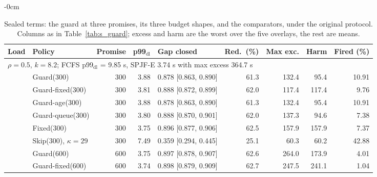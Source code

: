 \documentclass[mathematics,supfile,submit,moreauthors]{Definitions/mdpi}
\newcommand{\sealednum}[1]{#1}
\begin{document}
\begin{table}[htbp]
\begin{adjustwidth}{-\extralength}{0cm}
\centering
\caption{Sealed terms: the guard at three promises, its three budget shapes, and the comparators, under the original protocol. Columns as in Table~\ref{tab:s_guard}; excess and harm are the worst over the five overlays, the rest are means.}
\label{tab:guard_sealed}
\small
\setlength{\tabcolsep}{3pt}
\begin{tabular}{llrrlrrrr}
\toprule
Load & Policy & Promise & p99$_{\mathrm{dl}}$ & Gap closed & Red.\ (\%) & Max exc. & Harm & Fired (\%) \\
\midrule
\multicolumn{9}{l}{$\rho = \sealednum{0.5}$, $k = \sealednum{8.2}$; FCFS p99$_{\mathrm{dl}}$ = \sealednum{9.85} s, SPJF-E \sealednum{3.74} s with max excess \sealednum{364.7} s} \\
 & Guard($\sealednum{300}$)      & \sealednum{300} & \sealednum{3.88} & \sealednum{0.878 [0.863, 0.890]} & \sealednum{61.3} & \sealednum{132.4} & \sealednum{95.4} & \sealednum{10.91} \\
 & Guard-fixed($\sealednum{300}$) & \sealednum{300} & \sealednum{3.81} & \sealednum{0.888 [0.872, 0.899]} & \sealednum{62.0} & \sealednum{117.4} & \sealednum{117.4} & \sealednum{9.76} \\
 & Guard-age($\sealednum{300}$)  & \sealednum{300} & \sealednum{3.88} & \sealednum{0.878 [0.863, 0.890]} & \sealednum{61.3} & \sealednum{132.4} & \sealednum{95.4} & \sealednum{10.91} \\
 & Guard-queue($\sealednum{300}$) & \sealednum{300} & \sealednum{3.80} & \sealednum{0.888 [0.870, 0.901]} & \sealednum{62.0} & \sealednum{137.3} & \sealednum{94.6} & \sealednum{7.38} \\
 & Fixed($\sealednum{300}$)      & \sealednum{300} & \sealednum{3.75} & \sealednum{0.896 [0.877, 0.906]} & \sealednum{62.5} & \sealednum{157.9} & \sealednum{157.9} & \sealednum{7.37} \\
 & Skip($\sealednum{300}$), $\kappa=29$ & \sealednum{300} & \sealednum{7.49} & \sealednum{0.359 [0.294, 0.445]} & \sealednum{25.1} & \sealednum{60.3} & \sealednum{60.2} & \sealednum{42.88} \\
 & Guard($\sealednum{600}$)      & \sealednum{600} & \sealednum{3.75} & \sealednum{0.897 [0.878, 0.907]} & \sealednum{62.6} & \sealednum{264.0} & \sealednum{173.9} & \sealednum{4.01} \\
 & Guard-fixed($\sealednum{600}$) & \sealednum{600} & \sealednum{3.74} & \sealednum{0.898 [0.879, 0.909]} & \sealednum{62.7} & \sealednum{247.5} & \sealednum{241.1} & \sealednum{1.04} \\

\end{tabular}
\end{adjustwidth}
\end{table}
\end{document}
